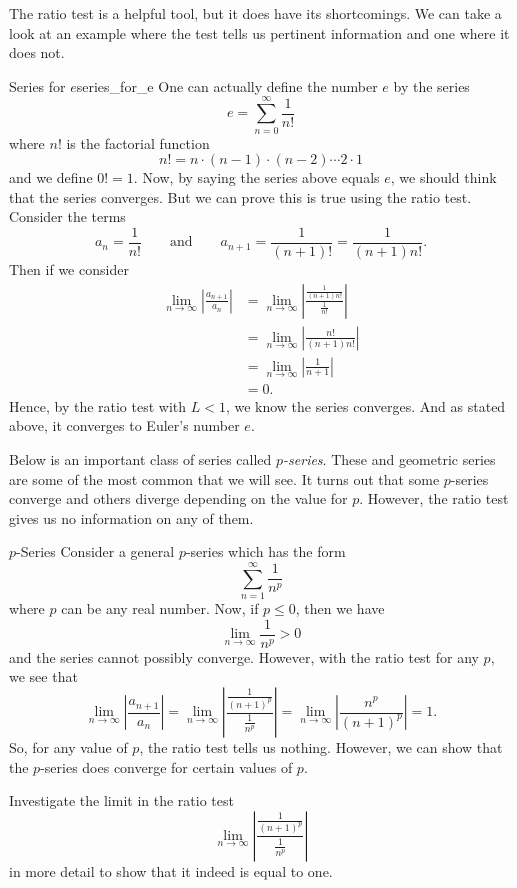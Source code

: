 The ratio test is a helpful tool, but it does have its shortcomings.  We can take a look at an example where the test tells us pertinent information and one where it does not.

\begin{ex}{Series for $e$}{series_for_e}
One can actually define the number $e$ by the series
\[
e=\sum_{n=0}^\infty \frac{1}{n!}
\]
where $n!$ is the factorial function
\[
n!=n\cdot (n-1)\cdot (n-2)\cdots 2\cdot 1
\]
and we define $0!=1$.  Now, by saying the series above equals $e$, we should think that the series converges. But we can prove this is true using the ratio test.  Consider the terms
\[
a_n = \frac{1}{n!} \qquad \textrm{and} \qquad a_{n+1}=\frac{1}{(n+1)!}=\frac{1}{(n+1)n!}.
\]
Then if we consider
\begin{align*}
    \lim_{n\to \infty} \left| \frac{a_{n+1}}{a_n}\right|&= \lim_{n\to \infty} \left| \frac{\frac{1}{(n+1)n!}}{\frac{1}{n!}}\right|\\
    &= \lim_{n\to \infty } \left| \frac{n!}{(n+1)n!}\right|\\
    &= \lim_{n \to \infty} \left| \frac{1}{n+1}\right|\\
    &= 0.
\end{align*}
Hence, by the ratio test with $L<1$, we know the series converges. And as stated above, it converges to Euler's number $e$.
\end{ex}

Below is an important class of series called \emph{$p$-series}. These and geometric series are some of the most common that we will see.  It turns out that some $p$-series converge and others diverge depending on the value for $p$. However, the ratio test gives us no information on any of them.

\begin{ex}{$p$-Series}{}
Consider a general $p$-series which has the form
\[
\sum_{n=1}^\infty \frac{1}{n^p}
\]
where $p$ can be any real number. Now, if $p\leq 0$, then we have
\[
\lim_{n \to \infty} \frac{1}{n^p}>0
\]
and the series cannot possibly converge.  However, with the ratio test for any $p$, we see that
\[
\lim_{n\to \infty} \left|\frac{a_{n+1}}{a_n}\right|=\lim_{n\to \infty} \left|\frac{\frac{1}{(n+1)^p}}{\frac{1}{n^p}}\right|  = \lim_{n\to \infty} \left| \frac{n^p}{(n+1)^p}\right| = 1.
\]
So, for any value of $p$, the ratio test tells us nothing.  However, we can show that the $p$-series does converge for certain values of $p$.
\end{ex}

\begin{exercise}
Investigate the limit in the ratio test
\[
\lim_{n\to \infty} \left|\frac{\frac{1}{(n+1)^p}}{\frac{1}{n^p}}\right|
\]
in more detail to show that it indeed is equal to one.
\end{exercise}

